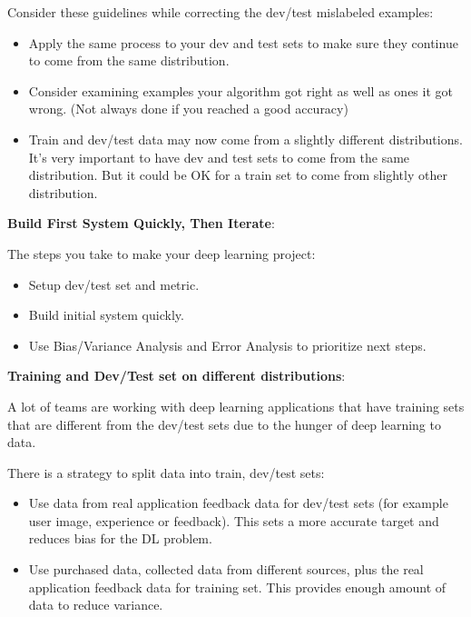\documentclass{article}
\begin{document}
\bigskip

\noindent Consider these guidelines while correcting the dev/test mislabeled examples:

\begin{itemize}
    \item Apply the same process to your dev and test sets to make sure they continue to come from the same distribution.
    \item Consider examining examples your algorithm got right as well as ones it got wrong. (Not always done if you reached a good accuracy)
    \item Train and dev/test data may now come from a slightly different distributions. It's very important to have dev and test sets to come from the same distribution. But it could be OK for a train set to come from slightly other distribution.
\end{itemize}

\noindent \textbf{Build First System Quickly, Then Iterate}:

\noindent The steps you take to make your deep learning project:

\begin{itemize}
    \item Setup dev/test set and metric.
    \item Build initial system quickly.
    \item Use Bias/Variance Analysis and Error Analysis to prioritize next steps.
\end{itemize}

\noindent \textbf{Training and Dev/Test set on different distributions}:

\noindent A lot of teams are working with deep learning applications that have training sets that are different from the dev/test sets due to the hunger of deep learning to data.

\bigskip

\noindent There is a strategy to split data into train, dev/test sets:

\begin{itemize}
    \item Use data from real application feedback data for dev/test sets (for example user image, experience or feedback). This sets a more accurate target and reduces bias for the DL problem.
    \item Use purchased data, collected data from different sources, plus the real application feedback data for training set. This provides enough amount of data to reduce variance.
\end{itemize}
\end{document}
